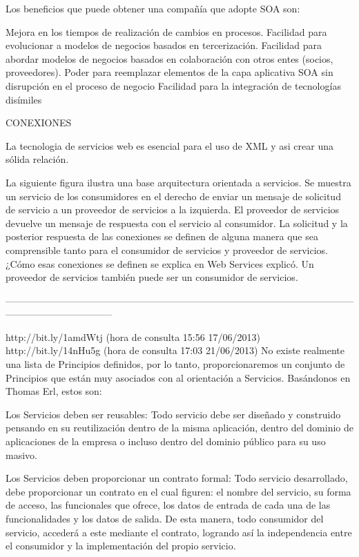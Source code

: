 Los beneficios que puede obtener una compañía que adopte SOA son:

    Mejora en los tiempos de realización de cambios en procesos.
    Facilidad para evolucionar a modelos de negocios basados en tercerización.
    Facilidad para abordar modelos de negocios basados en colaboración con otros entes (socios, proveedores).
    Poder para reemplazar elementos de la capa aplicativa SOA sin disrupción en el proceso de negocio
    Facilidad para la integración de tecnologías disímiles

CONEXIONES

La tecnologia de servicios web es esencial para el uso de XML y asi crear una sólida relación.

La siguiente figura ilustra una base arquitectura orientada a servicios. Se muestra un servicio de los consumidores en el derecho de 
enviar un mensaje de solicitud de servicio a un proveedor de servicios a la izquierda. El proveedor de servicios devuelve un mensaje 
de respuesta con el servicio al consumidor. La solicitud y la posterior respuesta de las conexiones se definen de alguna manera que 
sea comprensible tanto para el consumidor de servicios y proveedor de servicios. ¿Cómo esas conexiones se definen se explica en Web 
Services explicó. Un proveedor de servicios también puede ser un consumidor de servicios.

---------------------------------------------------------------------------------------------------------------------------------------------

http://bit.ly/1amdWtj (hora de consulta 15:56 17/06/2013)
http://bit.ly/14nHu5g (hora de consulta 17:03 21/06/2013)
No existe realmente una lista de Principios definidos, por lo tanto, proporcionaremos un conjunto de Principios que están muy asociados con al orientación a Servicios.
Basándonos en Thomas Erl, estos son:



    Los Servicios deben ser reusables: Todo servicio debe ser diseñado y construido pensando en su reutilización dentro de la misma 
    aplicación, dentro del dominio de aplicaciones de la empresa o incluso dentro del dominio público para su uso masivo.

    Los Servicios deben proporcionar un contrato formal: Todo servicio desarrollado, debe proporcionar un contrato en el cual figuren: 
    el nombre del servicio, su forma de acceso, las funcionales que ofrece, los datos de entrada de cada una de las funcionalidades y 
    los datos de salida. De esta manera, todo consumidor del servicio, accederá a este mediante el contrato, logrando así la independencia 
    entre el consumidor y la implementación del propio servicio.

